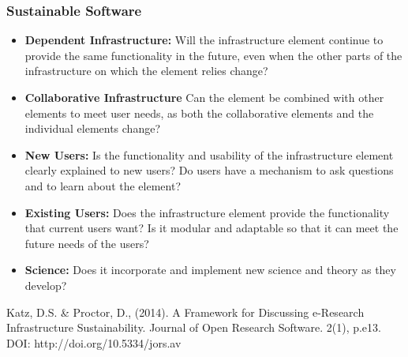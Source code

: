 \begin{frame}
\frametitle{Sustainable Software} 
\begin{itemize}
\item {\bf Dependent Infrastructure:} Will the infrastructure element continue to provide the same functionality in the future, even when the other parts of the infrastructure on which the element relies change?
\item {\bf Collaborative Infrastructure} Can the element be combined with other elements to meet user needs, as both the collaborative elements and the individual elements change?
\item {\bf New Users:} Is the functionality and usability of the infrastructure element clearly explained to new users? Do users have a mechanism to ask questions and to learn about the element?
\item {\bf Existing Users:} Does the infrastructure element provide the functionality that current users want? Is it modular and adaptable so that it can meet the future needs of the users?
\item {\bf Science:} Does it incorporate and implement new science and theory as they develop?
\end{itemize}

\tiny{ Katz, D.S. \& Proctor, D., (2014). A Framework for Discussing e-Research Infrastructure Sustainability. Journal of Open Research Software. 2(1), p.e13. DOI: http://doi.org/10.5334/jors.av}
\end{frame}


